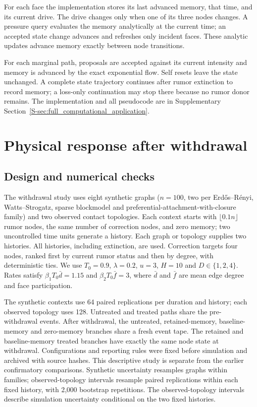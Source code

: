 \documentclass[final,5p,times,twocolumn,sort&compress]{elsarticle}
\theoremstyle{plain}
\begin{document}
For each face the implementation stores its last advanced memory, that time, and its current drive. The drive changes only when one of its three nodes changes. A pressure query evaluates the memory analytically at the current time; an accepted state change advances and refreshes only incident faces. These analytic updates advance memory exactly between node transitions.

For each marginal path, proposals are accepted against its current intensity and memory is advanced by the exact exponential flow. Self resets leave the state unchanged. A complete state trajectory continues after rumor extinction to record memory; a loss-only continuation may stop there because no rumor donor remains. The implementation and all pseudocode are in Supplementary Section~\ref{S-sec:full_computational_application}.

\section{Physical response after withdrawal}\label{sec:experiments}
\subsection{Design and numerical checks}
The withdrawal study uses eight synthetic graphs ($n=100$, two per Erd\H{o}s--R\'enyi, Watts--Strogatz, sparse blockmodel and preferential-attachment-with-closure family) and two observed contact topologies. Each context starts with $\lfloor0.1n\rfloor$ rumor nodes, the same number of correction nodes, and zero memory; two uncontrolled time units generate a history. Each graph or topology supplies two histories. All histories, including extinction, are used. Correction targets four nodes, ranked first by current rumor status and then by degree, with deterministic ties. We use $T_0=0.9$, $\lambda=0.2$, $u=3$, $H=10$ and $D\in\{1,2,4\}$. Rates satisfy $\beta_1T_0\bar d=1.15$ and $\beta_2T_0\bar f=3$, where $\bar d$ and $\bar f$ are mean edge degree and face participation.

The synthetic contexts use 64 paired replications per duration and history; each observed topology uses 128. Untreated and treated paths share the pre-withdrawal events. After withdrawal, the untreated, retained-memory, baseline-memory and zero-memory branches share a fresh event tape. The retained and baseline-memory treated branches have exactly the same node state at withdrawal. Configurations and reporting rules were fixed before simulation and archived with source hashes. This descriptive study is separate from the earlier confirmatory comparisons. Synthetic uncertainty resamples graphs within families; observed-topology intervals resample paired replications within each fixed history, with 2,000 bootstrap repetitions. The observed-topology intervals describe simulation uncertainty conditional on the two fixed histories.
\end{document}
